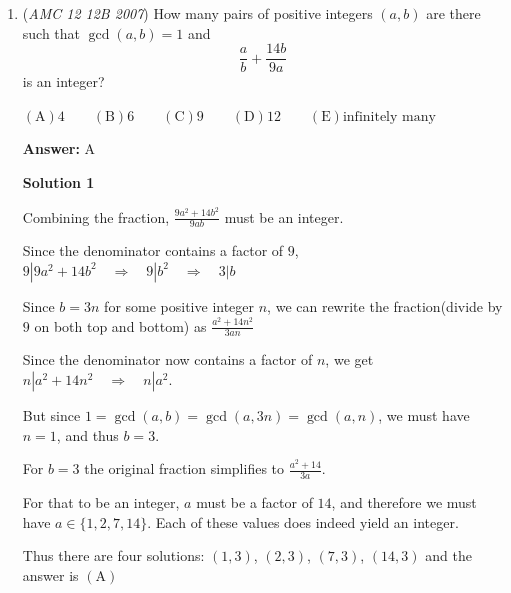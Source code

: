 \begin{enumerate}
 



\textbf{Solution 4}

All pythagorean triples can be parametrized in the form $(a, b, c) = k(r^2 - s^2), k(2rs), k(r^2 + s^2)$ for positive integers $k, r, s$. The area being triple the perimeter implies that 
 \[k^2(r^2 - s^2)rs = 3(k(r^2 - s^2) + k(2rs) + k(r^2 + s^2)).\] This can be simplified to get 
 \[ks(r - s) = 6.\] Now, we get the triples 
 \[(k, r, s) = (1, 7, 1), (1, 5, 2), (1, 5, 3), (1, 7, 6), (2, 4, 1), (2, 4, 3), (3, 3, 1), (3, 3, 2), (6, 2, 1).\] However, the ones where $r$ and $s$ are not different signs and relatively prime are redundant, so we get $6$ triples total.

 


	\item (\textit{AMC 12 12B 2007}) How many pairs of positive integers $(a,b)$ are there such that $\gcd{(a,b)}=1$ and 
 \[\frac{a}{b}+\frac{14b}{9a}\] is an integer?


 $\mathrm {(A)} 4\qquad \mathrm {(B)} 6\qquad \mathrm {(C)} 9\qquad \mathrm {(D)} 12\qquad \mathrm {(E)} \text{infinitely many}$

 \textbf{Answer: }A



\textbf{Solution 1}

Combining the fraction, $\frac{9a^2 + 14b^2}{9ab}$ must be an integer.

 Since the denominator contains a factor of $9$, $9 | 9a^2 + 14b^2 \quad\Longrightarrow\quad 9 | b^2 \quad\Longrightarrow\quad 3 | b$

 Since $b = 3n$ for some positive integer $n$, we can rewrite the fraction(divide by $9$ on both top and bottom) as $\frac{a^2 + 14n^2}{3an}$

 Since the denominator now contains a factor of $n$, we get $n | a^2 + 14n^2 \quad\Longrightarrow\quad n | a^2$.

 But since $1=\gcd(a,b)=\gcd(a,3n)=\gcd(a,n)$, we must have $n=1$, and thus $b=3$.

 For $b=3$ the original fraction simplifies to $\frac{a^2 + 14}{3a}$.

 For that to be an integer, $a$ must be a factor of $14$, and therefore we must have $a\in\{1,2,7,14\}$. Each of these values does indeed yield an integer.

 Thus there are four solutions: $(1,3)$, $(2,3)$, $(7,3)$, $(14,3)$ and the answer is $\mathrm{(A)}$





\end{enumerate}
